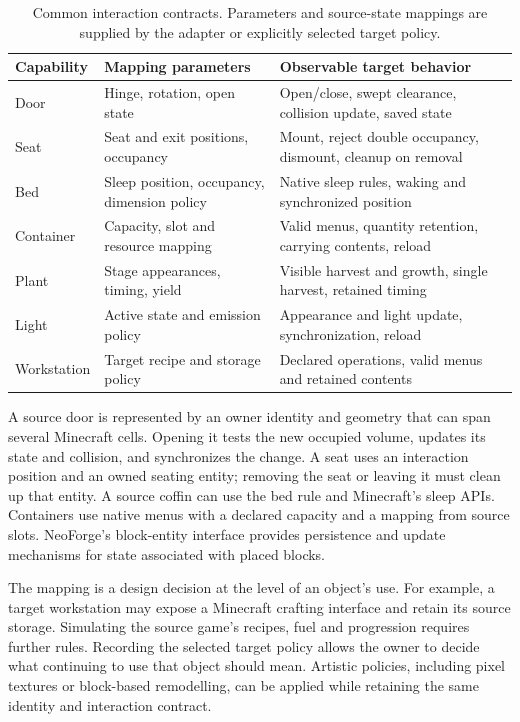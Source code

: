 \documentclass[11pt]{article}
\begin{document}
\begin{table}[t]
\centering\small
\begin{tabular}{p{.14\linewidth}p{.34\linewidth}p{.43\linewidth}}
\toprule
Capability & Mapping parameters & Observable target behavior\\
\midrule
Door & Hinge, rotation, open state & Open/close, swept clearance, collision update, saved state\\
Seat & Seat and exit positions, occupancy & Mount, reject double occupancy, dismount, cleanup on removal\\
Bed & Sleep position, occupancy, dimension policy & Native sleep rules, waking and synchronized position\\
Container & Capacity, slot and resource mapping & Valid menus, quantity retention, carrying contents, reload\\
Plant & Stage appearances, timing, yield & Visible harvest and growth, single harvest, retained timing\\
Light & Active state and emission policy & Appearance and light update, synchronization, reload\\
Workstation & Target recipe and storage policy & Declared operations, valid menus and retained contents\\
\bottomrule
\end{tabular}
\caption{Common interaction contracts. Parameters and source-state mappings are
supplied by the adapter or explicitly selected target policy.}
\label{tab:rules}
\end{table}

A source door is represented by an owner identity and geometry that can span
several Minecraft cells. Opening it tests the new occupied volume, updates its
state and collision, and synchronizes the change. A seat uses an interaction
position and an owned seating entity; removing the seat or leaving it must
clean up that entity. A source coffin can use the bed rule and Minecraft's sleep
APIs. Containers use native menus with a declared capacity and a mapping from
source slots. NeoForge's block-entity interface provides persistence and update
mechanisms for state associated with placed blocks.\cite{neoforge}

The mapping is a design decision at the level of an object's use. For example,
a target workstation may expose a Minecraft crafting interface and retain its
source storage. Simulating the source game's recipes, fuel and progression
requires further rules. Recording the selected target policy allows the owner
to decide what continuing to use that object should mean. Artistic policies,
including pixel textures or block-based remodelling, can be applied while
retaining the same identity and interaction contract.
\end{document}

